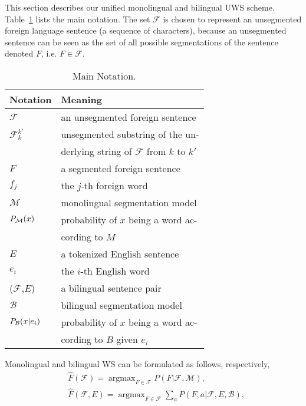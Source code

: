 \documentclass[11pt]{article}
\begin{document}
This section describes our unified monolingual and bilingual UWS scheme.
Table~\ref{tab:notation} lists the main notation. The set $\mathcal{F}$ is
chosen to represent an unsegmented foreign language sentence (a
sequence of characters), because an unsegmented sentence can be seen as the
set of all possible segmentations of the sentence denoted $F$, i.e. $F
\in \mathcal{F}$.

\begin{table}[h]
{
\begin{center}
\begin{tabular}{|l|l|}
\hline
 \bf Notation & \bf Meaning  \\ \hline
$\mathcal{F}$ & an unsegmented foreign sentence \\
$\mathcal{F}_k^{k'}$ &unsegmented substring of the un-\\
                     &derlying string of $\mathcal{F}$ from $k$ to $k'$ \\
$F$ &a segmented foreign sentence \\
$f_j$ & the $j$-th foreign word \\
$\mathcal{M}$ &monolingual segmentation model \\
$P_{\small \mathcal{M}}(x)$ & probability of $x$ being a word ac-\\
                            &cording to $M$ \\
$E$ & a tokenized English sentence \\
$e_i$ & the $i$-th English word \\
($\mathcal{F}$,$E$) &a bilingual sentence pair \\
$\mathcal{B}$ & bilingual segmentation model \\
$P_{\small \mathcal{B}}(x|e_i)$ & probability of $x$ being a word ac-\\
                              &cording to $B$ given $e_i$ \\
\hline
\end{tabular}
\end{center}
}
\caption{\label{tab:notation} Main Notation. }
\end{table}

Monolingual and bilingual WS can be formulated as follows, respectively,
\begin{align}
&\hat{F}(\mathcal{F})  = \mathop{argmax}_{F  \in \mathcal{F} } P(F|\mathcal{F},\mathcal{M}), \label{eq:segment:unigram} \\
&\hat{F}(\mathcal{F},E)  =\mathop{argmax}_{F \in \mathcal{F} } \sum_a P(F,a|\mathcal{F},E,\mathcal{B}),  \label{eq:segment:biling}
\end{align}
\end{document}
